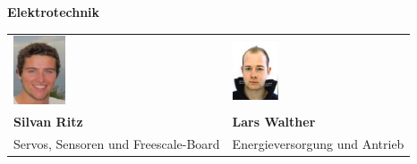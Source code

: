 \large
\textbf{Elektrotechnik}
\begin{table}[H]
\begin{tabular}{p{}p{}}	
	\includegraphics[width=0.25\textwidth]{./04_Projektmanagement/fig/silvanritz.jpg}	&			\includegraphics[width=0.27\textwidth]{./04_Projektmanagement/fig/larswalther.jpg} 
	\\
	\textbf{Silvan Ritz} & 	
	\textbf{Lars Walther}
	\\
	Servos, Sensoren und Freescale-Board &
	Energieversorgung und Antrieb
\end{tabular}
\end{table}

